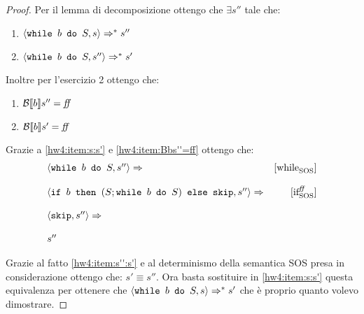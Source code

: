{\begin{proof}
Per il lemma di decomposizione ottengo che $\exists s''$ tale che:
\begin{enumerate}[label=(\Roman*)]
	\item $\confSs{\wbS{b}{S}}{s} \Rar{*} s''$
	\label{hw4:item:s:s'}
	\item $\confSs{\wbS{b}{S}}{s''} \Rar{*} s'$
	\label{hw4:item:s'':s'}
\end{enumerate}
Inoltre per l'esercizio 2 ottengo che:
\begin{enumerate}[label=(\alph*)]
	\item $\B{b}'' = \semfalse$
	\label{hw4:item:Bbs''=ff}
	\item $\B{b}' = \semfalse$
	
\end{enumerate}
Grazie a \ref{hw4:item:s:s'} e \ref{hw4:item:Bbs''=ff} ottengo che:
$$
\begin{array}{lr}
\confSs{\wbS{b}{S}}{s''} \Rar{}& \whileSOS\\
& \\
\confSs{\ifABC{b}{(S; \wbS{b}{S})}{\skipForFriends}}{s''} \Rar{}& \ifffSOS \\
 & \\
\confSs{\skipForFriends}{s''} \Rar{}& \\
& \\
s''
\end{array}
$$


Grazie al fatto \ref{hw4:item:s'':s'} e al determinismo della semantica SOS presa in considerazione
 ottengo che: $s' \equiv{ } s''$. 
Ora basta sostituire in \ref{hw4:item:s:s'} questa equivalenza per ottenere 
che $\confSs{\wbS{b}{S}}{s} \Rar{*} s'$ che è proprio quanto volevo dimostrare.
\end{proof}
}